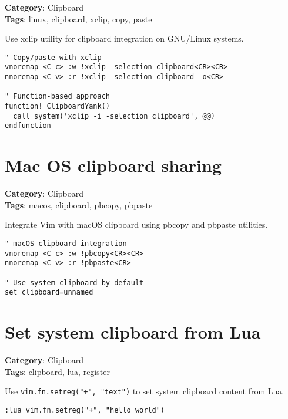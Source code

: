 {{{\textbf{Category}: Clipboard\\ \textbf{Tags}: linux, clipboard, xclip, copy, paste
\vspace{0.5cm}

Use xclip utility for clipboard integration on GNU/Linux systems.

\begin{Exa*}{}
\begin{Verbatim}[fontsize=\footnotesize, breaklines, breakanywhere]
" Copy/paste with xclip
vnoremap <C-c> :w !xclip -selection clipboard<CR><CR>
nnoremap <C-v> :r !xclip -selection clipboard -o<CR>

" Function-based approach
function! ClipboardYank()
  call system('xclip -i -selection clipboard', @@)
endfunction
\end{Verbatim}
\end{Exa*}

\section{Mac OS clipboard sharing}

\textbf{Category}: Clipboard\\ \textbf{Tags}: macos, clipboard, pbcopy, pbpaste
\vspace{0.5cm}

Integrate Vim with macOS clipboard using pbcopy and pbpaste utilities.

\begin{Exa*}{}
\begin{Verbatim}[fontsize=\footnotesize, breaklines, breakanywhere]
" macOS clipboard integration
vnoremap <C-c> :w !pbcopy<CR><CR>
nnoremap <C-v> :r !pbpaste<CR>

" Use system clipboard by default
set clipboard=unnamed
\end{Verbatim}
\end{Exa*}

\section{Set system clipboard from Lua}

\textbf{Category}: Clipboard\\ \textbf{Tags}: clipboard, lua, register
\vspace{0.5cm}

Use {\footnotesize \Verb§vim.fn.setreg("+", "text")§} to set system clipboard content from Lua.

\begin{Exa*}{}
\begin{Verbatim}[fontsize=\footnotesize, breaklines, breakanywhere]
:lua vim.fn.setreg("+", "hello world")
\end{Verbatim}
\end{Exa*}

}}}
